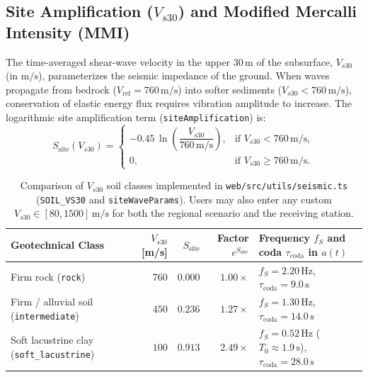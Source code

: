 \documentclass[11pt,a4paper]{article}
\newcommand{\src}[1]{\nolinkurl{#1}}
\newcommand{\unit}[1]{\mathrm{#1}}
\begin{document}
\subsection{Site Amplification (\texorpdfstring{$V_{s30}$}{Vs30}) and Modified Mercalli Intensity (MMI)}
\label{sec:sismo-vs30-mmi}

The time-averaged shear-wave velocity in the upper $30\,\unit{m}$ of the subsurface, $V_{s30}$ (in
$\unit{m/s}$), parameterizes the seismic impedance of the ground. When waves propagate from bedrock
($V_{\mathrm{ref}} = 760\,\unit{m/s}$) into softer sediments ($V_{s30} < 760\,\unit{m/s}$), conservation of
elastic energy flux requires vibration amplitude to increase. The logarithmic site amplification term
(\texttt{siteAmplification}) is:
\begin{equation}
  S_{\mathrm{site}}(V_{s30}) =
  \begin{cases}
    -0.45\,\ln\!\left(\dfrac{V_{s30}}{760\,\unit{m/s}}\right), & \text{if } V_{s30} < 760\,\unit{m/s},\\[8pt]
    0, & \text{if } V_{s30} \ge 760\,\unit{m/s}.
  \end{cases}
  \label{eq:amplificacion-vs30}
\end{equation}

\begin{table}[htbp]
\centering\small
\begin{tabularx}{\linewidth}{p{.28\linewidth}rrrX}
\toprule
\textbf{Geotechnical Class} & \textbf{$V_{s30}$ [m/s]} & \textbf{$S_{\mathrm{site}}$} & \textbf{Factor $e^{S_{\mathrm{site}}}$} & \textbf{Frequency $f_S$ and coda $\tau_{\mathrm{coda}}$ in $a(t)$}\\\midrule
Firm rock (\texttt{rock}) & $760$ & $0.000$ & $1.00\times$ & $f_S = 2.20\,\unit{Hz}$, $\tau_{\mathrm{coda}} = 9.0\,\unit{s}$\\
Firm / alluvial soil (\texttt{intermediate}) & $450$ & $0.236$ & $1.27\times$ & $f_S = 1.30\,\unit{Hz}$, $\tau_{\mathrm{coda}} = 14.0\,\unit{s}$\\
Soft lacustrine clay (\texttt{soft\_lacustrine}) & $100$ & $0.913$ & $2.49\times$ & $f_S = 0.52\,\unit{Hz}$ ($T_0\approx 1.9\,\unit{s}$), $\tau_{\mathrm{coda}} = 28.0\,\unit{s}$\\\bottomrule
\end{tabularx}
\caption{Comparison of $V_{s30}$ soil classes implemented in \src{web/src/utils/seismic.ts}
(\texttt{SOIL\_VS30} and \texttt{siteWaveParams}). Users may also enter any custom
$V_{s30}\in[80,1500]\,\unit{m/s}$ for both the regional scenario and the receiving station.}
\label{tab:comparacion-vs30}
\end{table}
\end{document}
